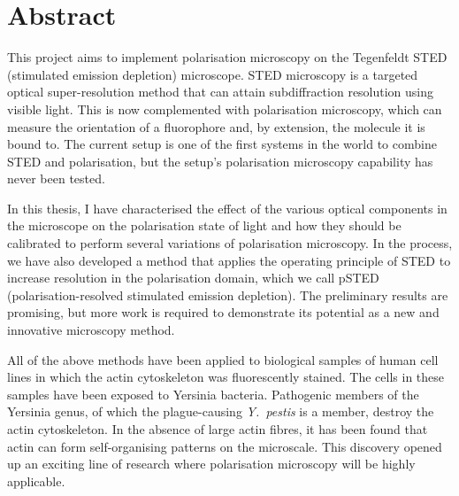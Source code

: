 \chapter{Abstract}

This project aims to implement polarisation microscopy on the Tegenfeldt STED (stimulated emission depletion) microscope. STED microscopy is a targeted optical super-resolution method that can attain subdiffraction resolution using visible light. This is now complemented with polarisation microscopy, which can measure the orientation of a fluorophore and, by extension, the molecule it is bound to. The current setup is one of the first systems in the world to combine STED and polarisation, but the setup's polarisation microscopy capability has never been tested.

In this thesis, I have characterised the effect of the various optical components in the microscope on the polarisation state of light and how they should be calibrated to perform several variations of polarisation microscopy. In the process, we have also developed a method that applies the operating principle of STED to increase resolution in the polarisation domain, which we call pSTED (polarisation-resolved stimulated emission depletion). The preliminary results are promising, but more work is required to demonstrate its potential as a new and innovative microscopy method.

All of the above methods have been applied to biological samples of human cell lines in which the actin cytoskeleton was fluorescently stained. The cells in these samples have been exposed to Yersinia bacteria. Pathogenic members of the Yersinia genus, of which the plague-causing \emph{Y.~pestis} is a member, destroy the actin cytoskeleton. In the absence of large actin fibres, it has been found that actin can form self-organising patterns on the microscale. This discovery opened up an exciting line of research where polarisation microscopy will be highly applicable.